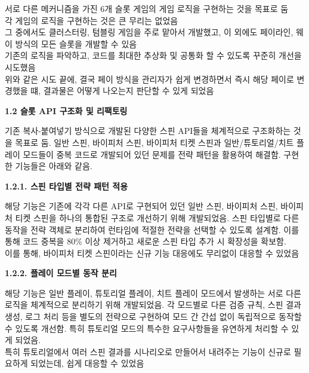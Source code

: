 \documentclass[letterpaper,11pt]{article}
\newcommand{\resumeSubProject}[2]{
  \item{
    {#1 \vspace{0pt}}
    {#2}
  }
}
\begin{document}
        {
        서로 다른 메커니즘을 가진 6개 슬롯 게임의 게임 로직을 구현하는 것을 목표로 둠 \\
        각 게임의 로직을 구현하는 것은 큰 무리는 없었음 \\
        그 중에서도 클러스터링, 텀블링 게임을 주로 맡아서 개발했고, 이 외에도 페이라인, 웨이 방식의 모든 슬롯을 개발할 수 있음 \\
        기존의 로직을 파악하고, 코드를 최대한 추상화 및 공통화 할 수 있도록 꾸준히 개선을 시도했음 \\
        위와 같은 시도 끝에, 결국 페이 방식을 관리자가 쉽게 변경하면서 즉시 해당 페이로 변경했을 떄, 결과물은 어떻게 나오는지 판단할 수 있게 되었음

        \vspace{7mm}

        \resumeSubProject{\textbf{1.2 슬롯 API 구조화 및 리팩토링}}
        
        {
        기존 복사-붙여넣기 방식으로 개발된 다양한 스핀 API들을 체계적으로 구조화하는 것을 목표로 둠. 일반 스핀, 바이피처 스핀, 바이피처 티켓 스핀과 일반/튜토리얼/치트 플레이 모드들이 중복 코드로 개발되어 있던 문제를 전략 패턴을 활용하여 해결함. 구현한 기능들은 아래와 같음. 
        
        \vspace{2mm}
        
        \textbf{1.2.1. 스핀 타입별 전략 패턴 적용}
        
        해당 기능은 기존에 각각 다른 API로 구현되어 있던 일반 스핀, 바이피처 스핀, 바이피처 티켓 스핀을 하나의 통합된 구조로 개선하기 위해 개발되었음. 스핀 타입별로 다른 동작을 전략 객체로 분리하여 런타임에 적절한 전략을 선택할 수 있도록 설계함. 이를 통해 코드 중복을 80\% 이상 제거하고 새로운 스핀 타입 추가 시 확장성을 확보함. \\
        이를 통해, 바이피처 티켓 스핀이라는 신규 기능 대응에도 무리없이 대응할 수 있었음
        
        \vspace{2mm}
        
        \textbf{1.2.2. 플레이 모드별 동작 분리}
        
        해당 기능은 일반 플레이, 튜토리얼 플레이, 치트 플레이 모드에서 발생하는 서로 다른 로직을 체계적으로 분리하기 위해 개발되었음. 각 모드별로 다른 검증 규칙, 스핀 결과 생성, 로그 처리 등을 별도의 전략으로 구현하여 모드 간 간섭 없이 독립적으로 동작할 수 있도록 개선함. 특히 튜토리얼 모드의 특수한 요구사항들을 유연하게 처리할 수 있게 되었음. \\
        특히 튜토리얼에서 여러 스핀 결과를 시나리오로 만들어서 내려주는 기능이 신규로 필요하게 되었는데, 쉽게 대응할 수 있었음
        
}}
\end{document}
